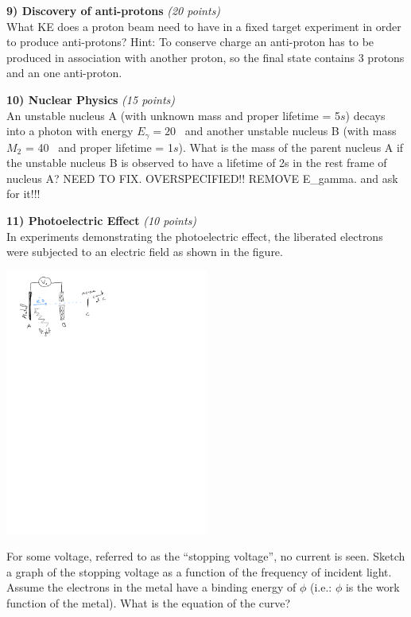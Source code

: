 {\vfill

\clearpage

\textbf{9) Discovery of anti-protons}  \hfill \textit{(20 points)}\\
What KE does a proton beam need to have in a fixed target experiment in order to produce anti-protons?
Hint: To conserve charge an anti-proton has to be produced in association with another proton, so the final state contains 3 protons and an one anti-proton.

\clearpage

\textbf{10) Nuclear Physics }\hfill \textit{(15 points)}\\
An unstable nucleus A (with unknown mass and proper lifetime = 5$s$) decays into a photon with energy $E_\gamma = 20$ \GeV\ and another unstable nucleus B (with mass $M_2$ = 40 \GeV\ and proper lifetime = 1$s$).
What is the mass of the parent nucleus A if the unstable nucleus B is observed to have a lifetime of 2s in the rest frame of nucleus A?
NEED TO FIX. OVERSPECIFIED!! REMOVE E_gamma. and ask for it!!!

\clearpage

\textbf{11) Photoelectric Effect }\hfill \textit{(10 points)}\\
In experiments demonstrating the photoelectric effect, the liberated electrons were subjected to an electric field as shown in the figure.
\begin{center}
\includegraphics[width=0.5\textwidth]{./PhotoelectricExp.pdf}
\end{center}
For some voltage, referred to as the ``stopping voltage'', no current is seen.
Sketch a graph of the stopping voltage as a function of the frequency of incident light.
Assume the electrons in the metal have a binding energy of $\phi$ (i.e.: $\phi$ is the  work function of the metal).
What is the equation of the curve?


}
